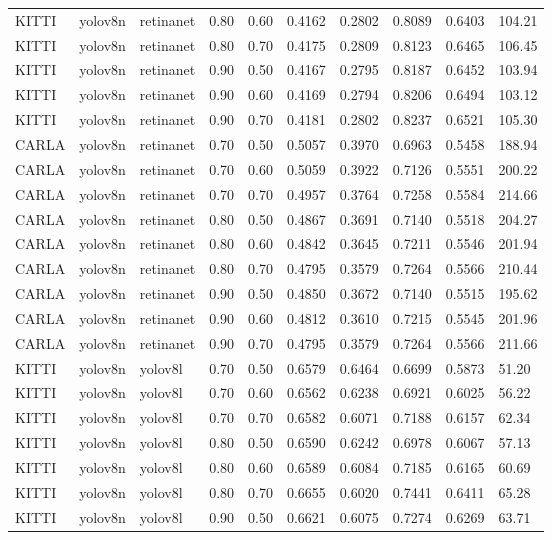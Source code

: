 \begin{tabular}{llllllllll}
KITTI & yolov8n & retinanet & 0.80 & 0.60 & 0.4162 & 0.2802 & 0.8089 & 0.6403 & 104.21 \\
KITTI & yolov8n & retinanet & 0.80 & 0.70 & 0.4175 & 0.2809 & 0.8123 & 0.6465 & 106.45 \\
KITTI & yolov8n & retinanet & 0.90 & 0.50 & 0.4167 & 0.2795 & 0.8187 & 0.6452 & 103.94 \\
KITTI & yolov8n & retinanet & 0.90 & 0.60 & 0.4169 & 0.2794 & 0.8206 & 0.6494 & 103.12 \\
KITTI & yolov8n & retinanet & 0.90 & 0.70 & 0.4181 & 0.2802 & 0.8237 & 0.6521 & 105.30 \\
CARLA & yolov8n & retinanet & 0.70 & 0.50 & 0.5057 & 0.3970 & 0.6963 & 0.5458 & 188.94 \\
CARLA & yolov8n & retinanet & 0.70 & 0.60 & 0.5059 & 0.3922 & 0.7126 & 0.5551 & 200.22 \\
CARLA & yolov8n & retinanet & 0.70 & 0.70 & 0.4957 & 0.3764 & 0.7258 & 0.5584 & 214.66 \\
CARLA & yolov8n & retinanet & 0.80 & 0.50 & 0.4867 & 0.3691 & 0.7140 & 0.5518 & 204.27 \\
CARLA & yolov8n & retinanet & 0.80 & 0.60 & 0.4842 & 0.3645 & 0.7211 & 0.5546 & 201.94 \\
CARLA & yolov8n & retinanet & 0.80 & 0.70 & 0.4795 & 0.3579 & 0.7264 & 0.5566 & 210.44 \\
CARLA & yolov8n & retinanet & 0.90 & 0.50 & 0.4850 & 0.3672 & 0.7140 & 0.5515 & 195.62 \\
CARLA & yolov8n & retinanet & 0.90 & 0.60 & 0.4812 & 0.3610 & 0.7215 & 0.5545 & 201.96 \\
CARLA & yolov8n & retinanet & 0.90 & 0.70 & 0.4795 & 0.3579 & 0.7264 & 0.5566 & 211.66 \\
KITTI & yolov8n & yolov8l & 0.70 & 0.50 & 0.6579 & 0.6464 & 0.6699 & 0.5873 & 51.20 \\
KITTI & yolov8n & yolov8l & 0.70 & 0.60 & 0.6562 & 0.6238 & 0.6921 & 0.6025 & 56.22 \\
KITTI & yolov8n & yolov8l & 0.70 & 0.70 & 0.6582 & 0.6071 & 0.7188 & 0.6157 & 62.34 \\
KITTI & yolov8n & yolov8l & 0.80 & 0.50 & 0.6590 & 0.6242 & 0.6978 & 0.6067 & 57.13 \\
KITTI & yolov8n & yolov8l & 0.80 & 0.60 & 0.6589 & 0.6084 & 0.7185 & 0.6165 & 60.69 \\
KITTI & yolov8n & yolov8l & 0.80 & 0.70 & 0.6655 & 0.6020 & 0.7441 & 0.6411 & 65.28 \\
KITTI & yolov8n & yolov8l & 0.90 & 0.50 & 0.6621 & 0.6075 & 0.7274 & 0.6269 & 63.71 \\

\end{tabular}
